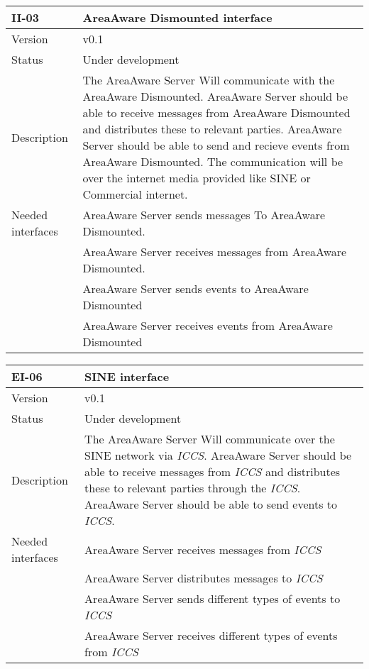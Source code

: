 \begin{longtable}{| p{3.5cm} |  p{10cm} | }
	\hline
	\textbf{II-03} &  \textbf{AreaAware Dismounted interface } \\
	\hline
	Version & v0.1 \\
	\hline
	Status & Under development \\
	\hline
	Description & The AreaAware Server Will communicate with the AreaAware Dismounted. AreaAware Server should be able to receive messages from AreaAware Dismounted and distributes these to relevant parties. AreaAware Server should be able to send and recieve events from AreaAware Dismounted. The communication will be over the internet media provided like SINE or Commercial internet.
	\\
	\hline
	Needed interfaces & AreaAware Server sends messages To AreaAware Dismounted.  \\
		 & AreaAware Server receives messages from AreaAware Dismounted. \\
		 & AreaAware Server sends events to AreaAware Dismounted  \\
		 & AreaAware Server receives events from AreaAware Dismounted  \\
	\hline
\end{longtable}

\begin{longtable}{| p{3.5cm} |  p{10cm} | }
	\hline
	\textbf{EI-06} &  \textbf{SINE interface} \\
	\hline
	Version & v0.1 \\
	\hline
	Status & Under development \\
	\hline
	Description & The AreaAware Server Will communicate over the SINE network via \emph{ICCS}\citep{iccs}. AreaAware Server should be able to receive messages from \emph{ICCS} and distributes these to relevant parties through the \emph{ICCS}.  AreaAware Server should be able to send events to \emph{ICCS}.
	\\
	\hline
	Needed interfaces 
	& AreaAware Server receives messages from \emph{ICCS} \\
	& AreaAware Server distributes messages to \emph{ICCS} \\
	& AreaAware Server sends different types of events to \emph{ICCS} \\
	& AreaAware Server receives different types of events from \emph{ICCS} \\
	\hline
\end{longtable}

